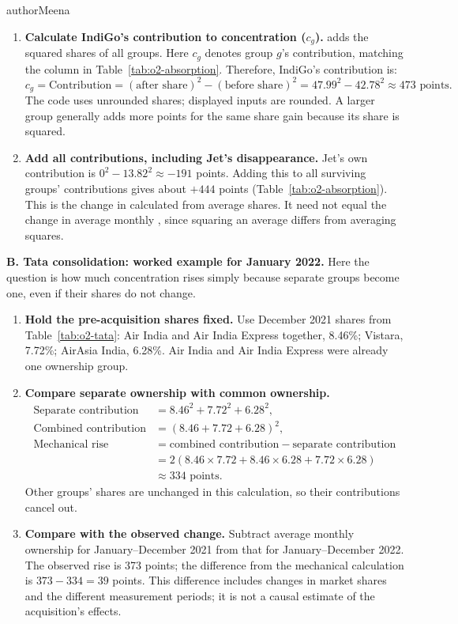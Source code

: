 \begin{authorcontribution}{authorMeena}
\begin{enumerate}[leftmargin=2em]
	\item \textbf{Calculate IndiGo's contribution to concentration ($c_g$).} \HHI{} adds the squared shares of all groups. Here $c_g$ denotes group $g$'s contribution, matching the column in Table~\ref{tab:o2-absorption}. Therefore, IndiGo's contribution is:
	\[
	c_g = \text{Contribution} = (\text{after share})^2-(\text{before share})^2
	= 47.99^2-42.78^2 \approx 473\text{ points}.
	\]
	The code uses unrounded shares; displayed inputs are rounded. A larger group generally adds more \HHI{} points for the same share gain because its share is squared.

	\item \textbf{Add all contributions, including Jet's disappearance.} Jet's own contribution is $0^2-13.82^2\approx-191$ points. Adding this to all surviving groups' contributions gives about $+444$ points (Table~\ref{tab:o2-absorption}). This is the change in \HHI{} calculated from average shares. It need not equal the change in average monthly \HHI{}, since squaring an average differs from averaging squares.
\end{enumerate}

\textbf{B. Tata consolidation: worked example for January 2022.}
Here the question is how much concentration rises simply because separate groups become one, even if their shares do not change.
\begin{enumerate}[leftmargin=2em]
	\item \textbf{Hold the pre-acquisition shares fixed.} Use December 2021 shares from Table~\ref{tab:o2-tata}: Air India and Air India Express together, 8.46\%; Vistara, 7.72\%; AirAsia India, 6.28\%. Air India and Air India Express were already one ownership group.

	\item \textbf{Compare separate ownership with common ownership.}
	\[
	\begin{aligned}
	\text{Separate contribution} &= 8.46^2+7.72^2+6.28^2,\\
	\text{Combined contribution} &= (8.46+7.72+6.28)^2,\\
	\text{Mechanical rise} &= \text{combined contribution}-\text{separate contribution}\\
	&= 2(8.46\times7.72+8.46\times6.28+7.72\times6.28)\\
	&\approx334\text{ points}.
	\end{aligned}
	\]
	Other groups' shares are unchanged in this calculation, so their contributions cancel out.

	\item \textbf{Compare with the observed change.} Subtract average monthly ownership \HHI{} for January--December 2021 from that for January--December 2022. The observed rise is 373 points; the difference from the mechanical calculation is $373-334=39$ points. This difference includes changes in market shares and the different measurement periods; it is not a causal estimate of the acquisition's effects.
\end{enumerate}


\end{authorcontribution}
